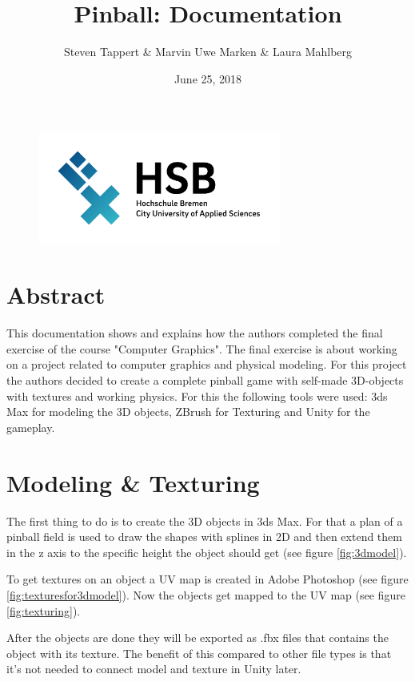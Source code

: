 \documentclass[11.5pt,oneside,a4paper]{scrartcl}
\title{Pinball: Documentation}
\author{Steven Tappert \& Marvin Uwe Marken \& Laura Mahlberg}
\date{June 25, 2018}
\newcounter{ct}
\begin{document}
\clearpage
{\let\newpage\relax\maketitle}
\thispagestyle{empty}
\vspace{20pt}

\begin{figure}
	\centering
	\includegraphics[width=8cm]{hsb.png} \\
\end{figure}

\newpage
\tableofcontents
\newpage

\section{Abstract}
This documentation shows and explains how the authors completed the final exercise of the course "Computer Graphics". The final exercise is about working on a project related to computer graphics and physical modeling. For this project the authors decided to create a complete pinball game with self-made 3D-objects with textures and working physics. For this the following tools were used: 3ds Max for modeling the 3D objects, ZBrush for Texturing and Unity for the gameplay. 

\section{Modeling \& Texturing}
The first thing to do is to create the 3D objects in 3ds Max. For that a plan of a pinball field is used to draw the shapes with splines in 2D and then extend them in the z axis to the specific height the object should get (see figure \ref{fig:3dmodel}).

To get textures on an object a UV map is created in Adobe Photoshop (see figure \ref{fig:texturesfor3dmodel}). Now the objects get mapped to the UV map (see figure \ref{fig:texturing}).

After the objects are done they will be exported as .fbx files that contains the object with its texture. The benefit of this compared to other file types is that it's not needed to connect model and texture in Unity later.
\end{document}
